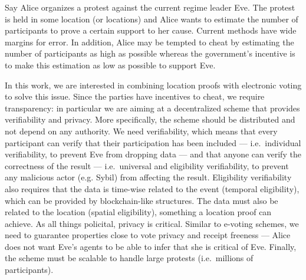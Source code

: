 Say Alice organizes a protest against the current regime leader Eve.
The protest is held in some location (or locations) and Alice wants to estimate 
the number of participants to prove a certain support to her cause.
Current methods have wide margins for error.
In addition, Alice may be tempted to cheat by estimating the number of 
participants as high as possible whereas the government's incentive is to make 
this estimation as low as possible to support Eve.
                                                                                  
In this work, we are interested in combining location proofs with electronic 
voting to solve this issue.
Since the parties have incentives to cheat, we require transparency: in 
particular we are aiming at a decentralized scheme that provides verifiability 
and privacy.
More specifically, the scheme should be distributed and not depend on any 
authority.
We need verifiability, which means that every participant can verify that their 
participation has been included --- i.e.\ individual verifiability, to prevent 
Eve from dropping data --- and that anyone can verify the correctness of the 
result --- i.e.\ universal and eligibility verifiability, to prevent any 
malicious actor (e.g. Sybil) from affecting the result.
Eligibility verifiability also requires that the data is time-wise related to 
the event (temporal eligibility), which can be provided by blockchain-like 
structures.
The data must also be related to the location (spatial eligibility), something 
a location proof can achieve.
As all things policital, privacy is critical.
Similar to e-voting schemes, we need to guarantee properties close to vote 
privacy and receipt freeness --- Alice does not want Eve's agents to be able to 
infer that she is critical of Eve.
Finally, the scheme must be scalable to handle large protests (i.e.\ millions 
of participants).


